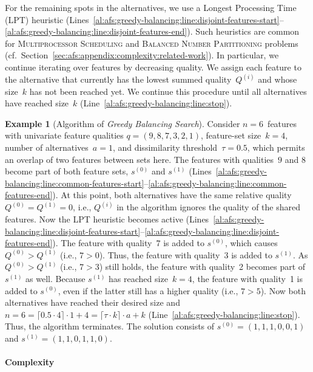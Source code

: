 \documentclass{article}
\theoremstyle{definition}
\newtheorem{example}{Example}
\begin{document}
For the remaining spots in the alternatives, we use a Longest Processing Time (LPT) heuristic (Lines~\ref{al:afs:greedy-balancing:line:disjoint-features-start}--\ref{al:afs:greedy-balancing:line:disjoint-features-end}).
Such heuristics are common for \textsc{Multiprocessor Scheduling} and \textsc{Balanced Number Partitioning} problems~\cite{babel1998thek, chen20023partitioning, lawrinenko2018reduction} (cf.~Section~\ref{sec:afs:appendix:complexity:related-work}).
In particular, we continue iterating over features by decreasing quality.
We assign each feature to the alternative that currently has the lowest summed quality~$Q^{(i)}$ and whose size~$k$ has not been reached yet.
We continue this procedure until all alternatives have reached size~$k$ (Line~\ref{al:afs:greedy-balancing:line:stop}).
%
\begin{example}[Algorithm of \emph{Greedy Balancing Search}]
	Consider $n=6$~features with univariate feature qualities $q = (9,8,7,3,2,1)$, feature-set size~$k=4$, number of alternatives~$a=1$, and dissimilarity threshold~$\tau = 0.5$, which permits an overlap of two features between sets here.
	The features with qualities~$9$ and $8$ become part of both feature sets, $s^{(0)}$ and $s^{(1)}$ (Lines~\ref{al:afs:greedy-balancing:line:common-features-start}--\ref{al:afs:greedy-balancing:line:common-features-end}).
	At this point, both alternatives have the same relative quality $Q^{(0)} = Q^{(1)} = 0$, i.e., $Q^{(i)}$ in the algorithm ignores the quality of the shared features.
	Now the LPT heuristic becomes active (Lines~\ref{al:afs:greedy-balancing:line:disjoint-features-start}--\ref{al:afs:greedy-balancing:line:disjoint-features-end}).
	The feature with quality~$7$ is added to $s^{(0)}$, which causes $Q^{(0)} > Q^{(1)}$ (i.e., $7 > 0$).
	Thus, the feature with quality~3 is added to $s^{(1)}$.
	As $Q^{(0)} > Q^{(1)}$ (i.e., $7 > 3$) still holds, the feature with quality~2 becomes part of $s^{(1)}$ as well.
	Because $s^{(1)}$ has reached size~$k = 4$, the feature with quality~1 is added to $s^{(0)}$, even if the latter still has a higher quality (i.e., $7 > 5$).
	Now both alternatives have reached their desired size and $n = 6 = \lceil 0.5 \cdot 4 \rceil \cdot 1 + 4 = \lceil \tau \cdot k \rceil \cdot a + k$ (Line~\ref{al:afs:greedy-balancing:line:stop}).
	Thus, the algorithm terminates.
	The solution consists of $s^{(0)} = (1,1,1,0,0,1)$ and $s^{(1)} = (1,1,0,1,1,0)$.
	\label{ex:afs:greedy-balancing:algorithm}
\end{example}

\paragraph{Complexity}
\end{document}
